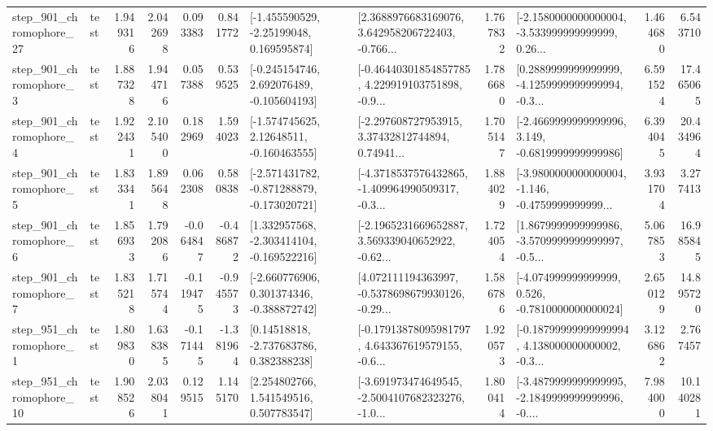 \begin{tabular}{llrrrrllrlrr}
  step\_901\_chromophore\_27 &      test &      1.949316 &    2.042698 &      0.093383 &  0.841772 &    [-1.455590529, -2.25199048, 0.169595874] &  [2.3688976683169076, 3.642958206722403, -0.766... &       1.767832 &  [-2.1580000000000004, -3.533999999999999, 0.26... &            1.464680 &          6.543710 \\
   step\_901\_chromophore\_3 &      test &      1.887328 &    1.944716 &      0.057388 &  0.539525 &   [-0.245154746, 2.692076489, -0.105604193] &  [-0.46440301854857785, 4.229919103751898, -0.9... &       1.786680 &  [0.2889999999999999, -4.1259999999999994, -0.3... &            6.591524 &         17.465065 \\
   step\_901\_chromophore\_4 &      test &      1.922431 &    2.105400 &      0.182969 &  1.594023 &    [-1.574745625, 2.12648511, -0.160463555] &  [-2.297608727953915, 3.37432812744894, 0.74941... &       1.705147 &  [-2.4669999999999996, 3.149, -0.6819999999999986] &            6.394045 &         20.434964 \\
   step\_901\_chromophore\_5 &      test &      1.833341 &    1.895648 &      0.062308 &  0.580838 &  [-2.571431782, -0.871288879, -0.173020721] &  [-4.3718537576432865, -1.409964990509317, -0.3... &       1.884029 &  [-3.9800000000000004, -1.146, -0.4759999999999... &            3.931704 &          3.277413 \\
   step\_901\_chromophore\_6 &      test &      1.856933 &    1.792086 &     -0.064847 & -0.486872 &   [1.332957568, -2.303414104, -0.169522216] &  [-2.1965231669652887, 3.569339040652922, -0.62... &       1.724054 &  [1.8679999999999986, -3.5709999999999997, -0.5... &            5.067853 &         16.985845 \\
   step\_901\_chromophore\_7 &      test &      1.835218 &    1.715744 &     -0.119475 & -0.945573 &   [-2.660776906, 0.301374346, -0.388872742] &  [4.072111194363997, -0.5378698679930126, -0.29... &       1.586786 &   [-4.074999999999999, 0.526, -0.7810000000000024] &            2.650129 &         14.895720 \\
   step\_951\_chromophore\_1 &      test &      1.809830 &    1.638385 &     -0.171445 & -1.381964 &     [0.14518818, -2.737683786, 0.382388238] &  [-0.17913878095981797, 4.643367619579155, -0.6... &       1.920573 &  [-0.18799999999999994, 4.138000000000002, -0.3... &            3.126862 &          2.767457 \\
  step\_951\_chromophore\_10 &      test &      1.908526 &    2.038041 &      0.129515 &  1.145170 &     [2.254802766, 1.541549516, 0.507783547] &  [-3.691973474649545, -2.5004107682323276, -1.0... &       1.800414 &  [-3.4879999999999995, -2.1849999999999996, -0.... &            7.984000 &         10.140281 \\

\end{tabular}
